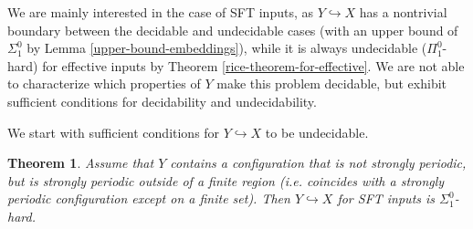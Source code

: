 \documentclass[a4paper]{article}
\newtheorem{theorem}{Theorem}[section]
\theoremstyle{definition}
\begin{document}
We are mainly interested in the case of SFT inputs, as $Y \hookrightarrow X$ has a nontrivial boundary between the decidable and undecidable cases (with an upper bound of $\Sigma^0_1$ by Lemma \ref{upper-bound-embeddings}), while it is always undecidable ($\Pi^0_1$-hard) for effective inputs by Theorem \ref{rice-theorem-for-effective}. We are not able to characterize which properties of $Y$ make this problem decidable, but exhibit sufficient conditions for decidability and undecidability. 

We start with sufficient conditions for $Y \hookrightarrow X$ to be undecidable. 
\begin{theorem}\label{eventuallyperiodic}
Assume that $Y$ contains a configuration that is not strongly periodic, but is strongly periodic outside of a finite region (i.e. coincides with a strongly periodic configuration except on a finite set). Then $Y \hookrightarrow X$ for SFT inputs is $\Sigma^0_1$-hard.
\end{theorem}
\end{document}
